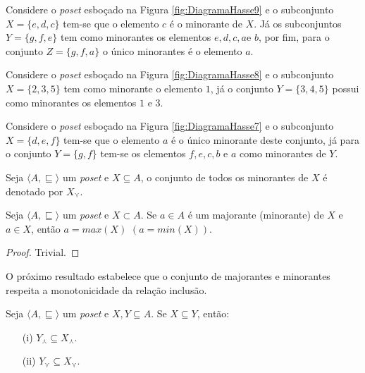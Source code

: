 \begin{example}
	Considere o \textit{poset} esboçado na Figura \ref{fig:DiagramaHasse9} e o subconjunto $X = \{e, d, c\}$ tem-se que o elemento $c$ é o minorante de $X$. Já os subconjuntos $Y = \{g, f, e\}$ tem como minorantes os elementos $e, d, c, a$e $b$, por fim, para o conjunto $Z = \{g, f, a\}$ o único minorantes é o elemento $a$.
\end{example}

\begin{example}
	Considere o \textit{poset} esboçado na Figura \ref{fig:DiagramaHasse8} e o subconjunto $X = \{2, 3, 5\}$  tem como minorante o elemento $1$, já o conjunto $Y = \{3, 4, 5\}$ possui como minorantes os elementos $1$ e $3$.
\end{example}

\begin{example}
	Considere o \textit{poset} esboçado na Figura \ref{fig:DiagramaHasse7} e o subconjunto $X = \{d, e, f\}$ tem-se que o elemento $a$ é o único minorante deste conjunto, já para o conjunto $Y = \{g, f\}$ tem-se os elementos $f, e, c, b$ e $a$ como minorantes de $Y$.
\end{example}

\begin{definition}\label{def:ConjuntoDosMjnorantes}
	Seja $\langle A, \sqsubseteq \rangle$ um \textit{poset} e $X \subseteq A$, o conjunto de todos os minorantes de $X$ é denotado por $X_\curlyvee$.
\end{definition}

\begin{theorem}
	Seja $\langle A, \sqsubseteq \rangle$ um \textit{poset} e $X \subset A$. Se $a \in A$ é um majorante (minorante) de $X$ e $a \in X$, então $a = max(X)$ $(a = min(X))$.
\end{theorem}

\begin{proof}
	Trivial.
\end{proof}

O próximo resultado estabelece que o conjunto de majorantes e minorantes respeita a monotonicidade da relação inclusão.

\begin{theorem}\label{teo:MonotonicidadeMajoranteMinorante}
	Seja $\langle A, \sqsubseteq \rangle$ um \textit{poset} e $X, Y \subseteq A$. Se $X \subseteq Y$, então: 
	\begin{itemize}
		\item[(i)] $Y_\curlywedge \subseteq X_\curlywedge$.
		\item[(ii)] $Y_\curlyvee \subseteq X_\curlyvee$.
	\end{itemize}
\end{theorem}

